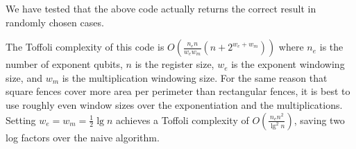 \documentclass[onecolumn,unpublished]{quantumarticle}
\theoremstyle{definition}
\theoremstyle{definition}
\theoremstyle{definition}
\begin{document}
We have tested that the above code actually returns the correct result in randomly chosen cases.

The Toffoli complexity of this code is $O(\frac{n_e n}{w_e w_m} (n + 2^{w_e + w_m}))$ where $n_e$ is the number of exponent qubits, $n$ is the register size, $w_e$ is the exponent windowing size, and $w_m$ is the multiplication windowing size.
For the same reason that square fences cover more area per perimeter than rectangular fences, it is best to use roughly even window sizes over the exponentiation and the multiplications.
Setting $w_e=w_m=\frac{1}{2}\lg n$ achieves a Toffoli complexity of $O(\frac{n_e n^2}{\lg^2 n})$, saving two log factors over the naive algorithm.


\begin{figure}[h]
\end{figure}
\end{document}
